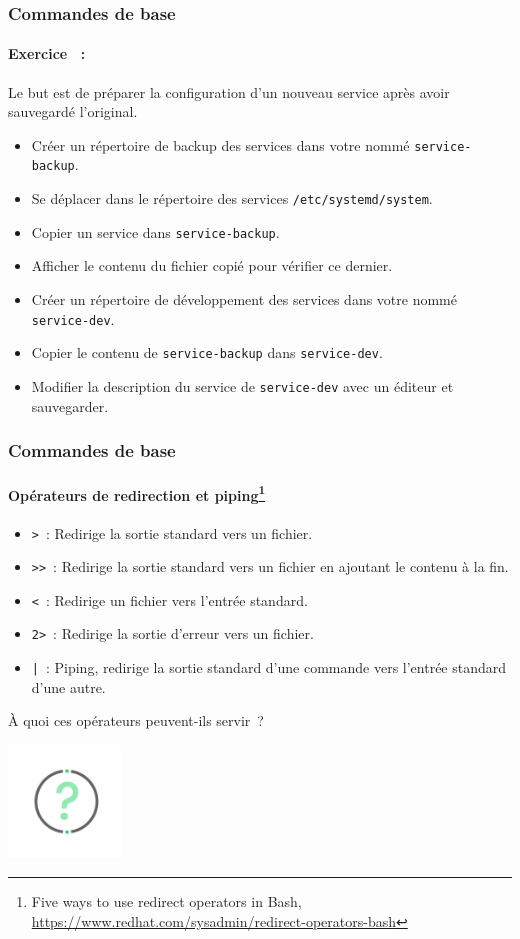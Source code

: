 \documentclass{beamer}
\begin{document}
    \begin{frame}
        \transdissolve
        \frametitle{Commandes de base}
        \framesubtitle{Exercice \execcounterdispinc{}~:}
        Le but est de préparer la configuration d'un nouveau service après avoir sauvegardé l'original.
        \begin{itemize}
            \item Créer un répertoire de backup des services dans votre  nommé \lstinline{service-backup}.
            \item Se déplacer dans le répertoire des services \lstinline{/etc/systemd/system}.
            \item Copier un service dans \lstinline{service-backup}.
            \item Afficher le contenu du fichier copié pour vérifier ce dernier.
            \item Créer un répertoire de développement des services dans votre  nommé \lstinline{service-dev}.
            \item Copier le contenu de \lstinline{service-backup} dans \lstinline{service-dev}.
            \item Modifier la description du service de \lstinline{service-dev} avec un éditeur et sauvegarder.
        \end{itemize}
    \end{frame}

    \begin{frame}
        \transdissolve
        \frametitle{Commandes de base}
        \framesubtitle{Opérateurs de redirection et piping\footnote{Five ways to use redirect operators in Bash, \url{https://www.redhat.com/sysadmin/redirect-operators-bash}}}
        \begin{itemize}
            \item \lstinline{>}~: Redirige la sortie standard vers un fichier.
            \item \lstinline{>>}~: Redirige la sortie standard vers un fichier en ajoutant le contenu à la fin.
            \item \lstinline{<}~: Redirige un fichier vers l'entrée standard.
            \item \lstinline{2>}~: Redirige la sortie d'erreur vers un fichier.
            \item \lstinline{|}~: Piping, redirige la sortie standard d'une commande vers l'entrée standard d'une autre.
        \end{itemize}
        À quoi ces opérateurs peuvent-ils servir~?
        \begin{center}
            \includegraphics[width=3cm]{image/question-mark}
        \end{center}
    \end{frame}
\end{document}
